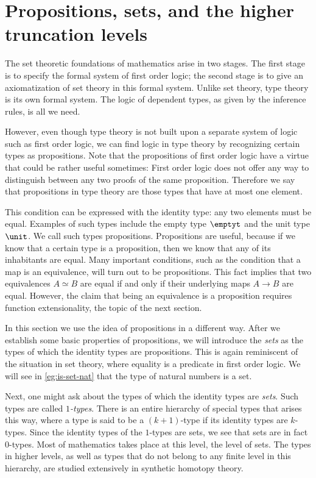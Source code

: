 
\section{Propositions, sets, and the higher truncation levels}
\label{chap:hierarchy}

The set theoretic foundations of mathematics arise in two stages. The first stage is to specify the formal system of first order logic; the second stage is to give an axiomatization of set theory in this formal system. Unlike set theory, type theory is its own formal system. The logic of dependent types, as given by the inference rules, is all we need.

However, even though type theory is not built upon a separate system of logic such as first order logic, we can find logic in type theory by recognizing certain types as propositions. Note that the propositions of first order logic have a virtue that could be rather useful sometimes: First order logic does not offer any way to distinguish between any two proofs of the same proposition. Therefore we say that propositions in type theory are those types that have at most one element.

This condition can be expressed with the identity type: any two elements must be equal. Examples of such types include the empty type $\emptyt$ and the unit type $\unit$. We call such types propositions. Propositions are useful, because if we know that a certain type is a proposition, then we know that any of its inhabitants are equal. Many important conditions, such as the condition that a map is an equivalence, will turn out to be propositions. This fact implies that two equivalences $A\simeq B$ are equal if and only if their underlying maps $A\to B$ are equal. However, the claim that being an equivalence is a proposition requires function extensionality, the topic of the next section.

In this section we use the idea of propositions in a different way. After we establish some basic properties of propositions, we will introduce the \emph{sets} as the types of which the identity types are propositions. This is again reminiscent of the situation in set theory, where equality is a predicate in first order logic. We will see in \cref{eg:is-set-nat} that the type of natural numbers is a set.

Next, one might ask about the types of which the identity types are \emph{sets}. Such types are called \emph{$1$-types}. There is an entire hierarchy of special types that arises this way, where a type is said to be a $(k+1)$-type if its identity types are $k$-types. Since the identity types of the $1$-types are sets, we see that sets are in fact $0$-types. Most of mathematics takes place at this level, the level of sets. The types in higher levels, as well as types that do not belong to any finite level in this hierarchy, are studied extensively in synthetic homotopy theory.

